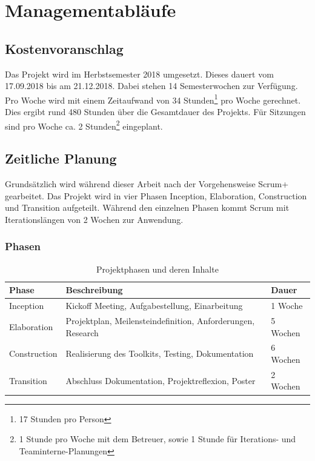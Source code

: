 
\section{Managementabläufe}
\subsection{Kostenvoranschlag}
Das Projekt wird im Herbstsemester 2018 umgesetzt. Dieses dauert vom 17.09.2018 bis am 21.12.2018. Dabei stehen 14 Semesterwochen zur Verfügung. Pro Woche wird mit einem Zeitaufwand von 34 Stunden\footnote{ 17 Stunden pro Person} pro Woche gerechnet. Dies ergibt rund 480 Stunden über die Gesamtdauer des Projekts. Für Sitzungen sind pro Woche ca. 2 Stunden\footnote{ 1 Stunde pro Woche mit dem Betreuer, sowie 1 Stunde für Iterations- und Teaminterne-Planungen} eingeplant. 

\subsection{Zeitliche Planung}
Grundsätzlich wird während dieser Arbeit nach der Vorgehensweise Scrum+ gearbeitet. Das Projekt wird in vier Phasen Inception, Elaboration, Construction und Transition aufgeteilt. Während den einzelnen Phasen kommt Scrum mit Iterationslängen von 2 Wochen zur Anwendung.

\subsubsection{Phasen}
\begin{table}[H]
    \centering
    \def\arraystretch{2}
    \begin{tabular}{| p{2.5cm} | p{10.5cm} | p{3cm} |} \hline
        \textbf{Phase} & \textbf{Beschreibung} & \textbf{Dauer} \\ \hline
        Inception & Kickoff Meeting, Aufgabestellung, Einarbeitung & 1 Woche \\ \hline
        Elaboration & Projektplan, Meilensteindefinition, Anforderungen, Research & 5 Wochen \\ \hline
        Construction & Realisierung des Toolkits, Testing, Dokumentation & 6 Wochen \\ \hline 
        Transition & Abschluss Dokumentation, Projektreflexion, Poster & 2 Wochen \\ \hline
    \end{tabular}
    \caption{Projektphasen und deren Inhalte}
\end{table}

